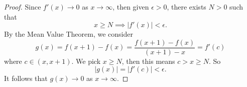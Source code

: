 \begin{Exercise}
\begin{proof}
Since $f'(x)\to 0$ as $x\to\infty$, then given $\epsilon>0$, there exists $N>0$ such that
$$
x\geq N \implies |f'(x)| < \epsilon.
$$
By the Mean Value Theorem, we consider
$$
g(x) = f(x+1)-f(x)
= \frac{f(x+1)-f(x)}{(x+1)-x}
= f'(c)
$$
where $c\in(x,x+1)$. 
We pick $x \geq N$, then this means $c>x\geq N$. So
$$
|g(x)| = |f'(c)| < \epsilon.
$$
It follows that $g(x)\to 0$ as $x\to\infty$.
\end{proof}
\end{Exercise}